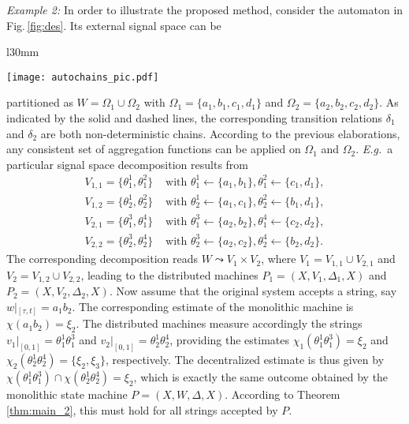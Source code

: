 \documentclass[a4paper, 10pt, conference]{ieeeconf}
\newcommand{\Eg}{\emph{E.g.}~}
\newcommand{\hspm}{\hspace{-2pt}}
\newcommand{\taut}{{_{[\tau,t]}}}
\begin{document}
\emph{Example 2:}
In order to illustrate the proposed method, consider the automaton in Fig.\,\ref{fig:des}. Its external signal space can be
\begin{wrapfigure}{l}{30mm}
\vspace{-15pt}
\begin{center}
\texttt{[image: autochains\_pic.pdf]}
\vspace{-17pt}
\caption{\hspm\hspm\hspm Finite\,state\,machine.}
\label{fig:des}
\vspace{-10pt}
\end{center}
\end{wrapfigure}
partitioned as $W=\Omega_1\cup\Omega_2$ with $\Omega_1=\{a_1,b_1,c_1,d_1\}$ and $\Omega_2=\{a_2,b_2,c_2,d_2\}$. As indicated by the solid and dashed lines, the corresponding transition relations  $\delta_1$ and $\delta_2$ are both non-deterministic chains. According to the previous elaborations, any consistent set of aggregation functions can be applied on $\Omega_1$ and $\Omega_2$. \Eg a particular signal space decomposition results from
\begin{align*}
V_{1,1} =\{\theta^1_1,\theta^2_1\} & \text{ with } \theta^1_1 \gets \{a_1,b_1\}, \theta^2_1 \gets \{c_1,d_1\}, \\
V_{1,2} =\{\theta^1_2,\theta^2_2\} & \text{ with } \theta^1_2 \gets \{a_1,c_1\}, \theta^2_2 \gets \{b_1,d_1\}, \\
V_{2,1} =\{\theta^3_1,\theta^4_1\} & \text{ with } \theta^3_1 \gets \{a_2,b_2\}, \theta^4_1 \gets \{c_2,d_2\}, \\
V_{2,2} =\{\theta^3_2,\theta^4_2\} & \text{ with } \theta^3_2 \gets \{a_2,c_2\}, \theta^4_2 \gets \{b_2,d_2\}.
\end{align*}
The corresponding decomposition reads $W\leadsto V_1\times V_2$, where $V_1=V_{1,1}\cup V_{2,1}$ and $V_2=V_{1,2}\cup V_{2,2}$, leading to the distributed machines $P_1=(X,V_1,\Delta_1,X)$ and $P_2=(X,V_2,\Delta_2,X)$. Now assume that the original system accepts a string, say$w|\taut=  a_1 b_2 $. The corresponding estimate of the monolithic machine is $\chi(a_1 b_2)=\xi_2$. The distributed machines measure accordingly the strings $v_1|_{[0,1]}=\theta^1_1 \theta^3_1 $ and $v_2|_{[0,1]}=\theta^1_2 \theta^4_2$, providing the estimates $\chi_1(\theta^1_1 \theta^3_1)=\xi_2$ and $\chi_2(\theta^1_2 \theta^4_2)=\{\xi_2,\xi_3\}$, respectively. The decentralized estimate is thus given by $\chi(\theta^1_1 \theta^3_1 )\cap\chi(\theta^1_2 \theta^4_2)=\xi_2$, which is exactly the same outcome obtained by the monolithic state machine $P=(X,W,\Delta,X)$. According to Theorem\,\ref{thm:main_2}, this must hold for all strings accepted by  $P$.~\QED
\end{document}
